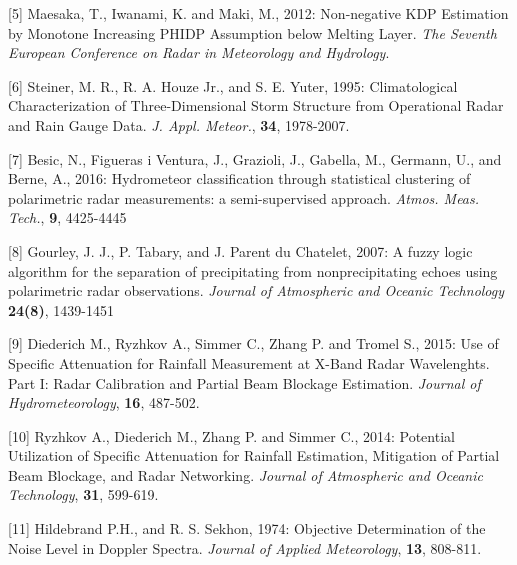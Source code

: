 \documentclass[potrait,a0paper,fontscale=0.33]{baposter} %
\begin{document}
\begin{poster}
{[5] Maesaka, T., Iwanami, K. and Maki, M., 2012: Non-negative KDP Estimation by Monotone Increasing PHIDP Assumption below Melting Layer. \textit{The Seventh European Conference on Radar in Meteorology and Hydrology}.
\medskip

[6] Steiner, M. R., R. A. Houze Jr., and S. E. Yuter, 1995: Climatological Characterization of Three-Dimensional Storm Structure from Operational Radar and Rain Gauge Data. \textit{J. Appl. Meteor.}, \textbf{34}, 1978-2007.
\medskip

[7] Besic, N., Figueras i Ventura, J., Grazioli, J., Gabella, M., Germann, U., and Berne, A., 2016: Hydrometeor classification through statistical clustering of polarimetric radar measurements: a semi-supervised approach. \textit{Atmos. Meas. Tech.}, \textbf{9}, 4425-4445
\medskip

[8] Gourley, J. J., P. Tabary, and J. Parent du Chatelet, 2007: A fuzzy logic algorithm for the separation of precipitating from nonprecipitating echoes using polarimetric radar observations. \textit{Journal of Atmospheric and Oceanic Technology} \textbf{24(8)}, 1439-1451
\medskip

[9] Diederich M., Ryzhkov A., Simmer C., Zhang P. and Tromel S., 2015: Use of Specific Attenuation for Rainfall Measurement at X-Band Radar Wavelenghts. Part I: Radar Calibration and Partial Beam Blockage Estimation. \textit{Journal of Hydrometeorology}, \textbf{16}, 487-502.
\medskip

[10] Ryzhkov A., Diederich M., Zhang P. and Simmer C., 2014: Potential Utilization of Specific Attenuation for Rainfall Estimation, Mitigation of Partial Beam Blockage, and Radar Networking. \textit{Journal of Atmospheric and Oceanic Technology}, \textbf{31}, 599-619.
\medskip

[11] Hildebrand P.H., and R. S. Sekhon, 1974: Objective Determination of the Noise Level in Doppler Spectra. \textit{Journal of Applied Meteorology}, \textbf{13}, 808-811.

}

\end{poster}
\end{document}
